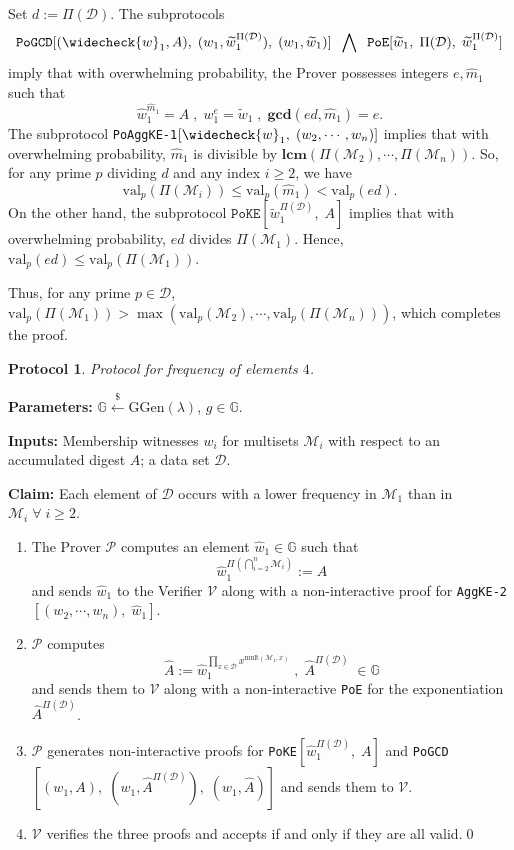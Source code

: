 \documentclass[11pt, lettersize, notitlepage, leqno, footskip=0.6cm]{article}
\newcommand{\pl}{\prod\limits}
\newcommand{\ttt}{\texttt}
\newcommand{\wti}{\widetilde}
\newcommand{\mc}{\mathcal}
\newcommand{\mb}{\mathbb}
\newcommand{\mbf}{\mathbf}
\newcommand{\mr}{\mathrm}
\newcommand{\lamb}{\lambda}
\newcommand{\what}{\widehat}
\newcommand{\weck}{\widecheck}
\newcommand{\mP}{\mc{P}}
\newcommand{\V}{\mc{V}}
\newcommand{\mcM}{\mc{M}}
\newcommand{\vs}{\vspace{-0.15cm}}
\newcommand{\noin}{\noindent}
\newcommand{\op}{overwhelming probability}
\newcommand{\nons}{non-interactive proofs}
\newcommand{\LCM}{\mbf{lcm}}
\newcommand{\GCD}{\mbf{gcd}}
\newtheorem{Prot}[Thm]{Protocol}
\numberwithin{equation}{section}
\begin{document}
\begin{prf} Set $d:= \Pi(\mc{D})$. The subprotocols \vs $$\ttt{PoGCD}[(\weck{w}_1, A),\;(w_1,\wti{w}_1^{\Pi(\mc{D})}),\;(w_1,\wti{w}_1)]\;\;\bigwedge\;\;\ttt{PoE}[\wti{w}_1,\;\Pi(\mc{D}),\;\wti{w}_1^{\Pi(\mc{D})}] $$ imply that with \op, the Prover possesses integers $e, \what{m}_1$ such that \vs $$\what{w}_1^{\what{m}_1} = A\;,\;w_1^{e} = \wti{w}_1\;,\; \GCD(ed, \what{m}_1)  = e .$$ The subprotocol \verb|PoAggKE-1|$[\weck{w}_1,\;(w_2,\cdots,w_n)]$ implies that with \op, $\what{m}_1$ is divisible by $\LCM(\Pi(\mcM_2),\cdots,\Pi(\mcM_n))$. So, for any prime $p$ dividing $d$ and any index $i\geq 2$, we have \vs $$\mr{val}_p(\Pi(\mcM_i)) \leq \mr{val}_p(\what{m}_1) < \mr{val}_p(ed).$$ On the other hand, the subprotocol $\ttt{PoKE}[\wti{w}_1^{\Pi(\mc{D})},\;A]$ implies that with \op, $ed$ divides $\Pi(\mcM_1)$. Hence, $\mr{val}_p(ed)\leq \mr{val}_p(\Pi(\mcM_1))$.

Thus, for any prime $p \in \mc{D}$, $\mr{val}_p(\Pi(\mcM_1))> \max(\mr{val}_p(\mcM_2),\cdots, \mr{val}_p(\Pi(\mcM_n)))$, which completes the proof.\end{prf}

\vspace{0.15cm}

\begin{Prot} Protocol for frequency of elements $4$.\end{Prot} \vspace{-0.3cm}

\noin \textbf{Parameters:} $\mb{G}\xleftarrow{\$} \mr{GGen}(\lamb)$,\; $g\in \mb{G}$.

\noin \textbf{Inputs:} Membership witnesses $w_i$ for multisets $\mc{M}_i$ with respect to an accumulated digest $A$; a data set $\mc{D}$.

\noin \textbf{Claim:} Each element of $\mc{D}$ occurs with a lower frequency in $\mc{M}_1$ than in $\mc{M}_i\;\forall\;i\geq 2$. \vs

\begin{enumerate}[wide, labelwidth=!, labelindent=0pt] \vs

\item The Prover $\mP$ computes an element $\what{w}_1\in\mb{G}$ such that \vs $$\what{w}_1^{\Pi(\bigcap\limits_{i=2}^n \mc{M}_i)}:= A$$ and sends $\what{w}_1$ to the Verifier $\V$ along with a non-interactive proof for \verb|AggKE-2|$[(w_2,\cdots,w_n),\;\what{w}_1]$. \vspace{-0.5cm}

\item $\mP$ computes \vs $$\what{A}:= \what{w}_1^{\pl_{x\in\mc{D}}x^{\mr{mult}(\mc{M}_1,x)}}\;,\;\what{A}^{\Pi(\mc{D})}\;\in\mb{G}$$ and sends them to $\V$ along with a non-interactive \verb|PoE| for the exponentiation $\what{A}^{\Pi(\mc{D})}$. \vs

\item $\mP$ generates \nons\; for \verb|PoKE|$[\what{w}_1^{\Pi(\mc{D})},\;A]$ and \verb|PoGCD|$[(w_1,A),\;(w_1, \what{A}^{\Pi(\mc{D})}),\;(w_1, \what{A})]$ and sends them to $\V$. \vs

\item $\V$ verifies the three proofs and accepts if and only if they are all valid.\qed\end{enumerate}
\end{document}
